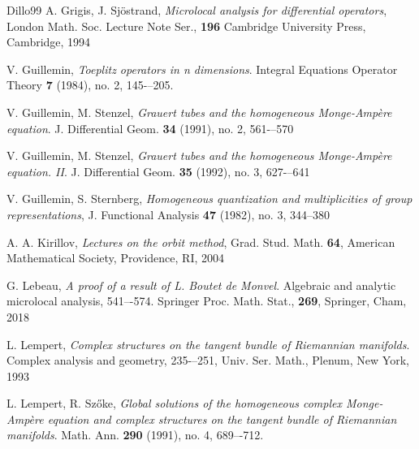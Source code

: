 \documentclass[12pt,a4paper]{article}
\theoremstyle{plain}
\theoremstyle{definition}
\begin{document}
\begin{thebibliography}{Dillo99}
A. Grigis, J. Sj\"{o}strand, {\em
Microlocal analysis for differential operators},
London Math. Soc. Lecture Note Ser., \textbf{196}
Cambridge University Press, Cambridge, 1994

V. Guillemin, {\em Toeplitz operators in n dimensions}. Integral Equations 
Operator Theory \textbf{7} (1984), no. 2, 145-–205.

V. Guillemin, M. Stenzel, {\em Grauert tubes and the homogeneous 
Monge-Amp\`{e}re equation}. J. Differential Geom. \textbf{34} (1991), no. 2, 561-–570

V. Guillemin, M. Stenzel, {\em Grauert tubes and the homogeneous Monge-Amp\`{e}re equation. II}. J. Differential Geom. \textbf{35} (1992), no. 3, 
627-–641


 V. Guillemin, S. Sternberg, 
{\em 
Homogeneous quantization and multiplicities of group representations},
J. Functional Analysis \textbf{47} (1982), no. 3, 344–380


A. A. Kirillov, 
{\em Lectures on the orbit method},
Grad. Stud. Math. \textbf{64},
American Mathematical Society, Providence, RI, 2004


G. Lebeau, {\em
A proof of a result of L. Boutet de Monvel}.
Algebraic and analytic microlocal analysis, 541–-574.
Springer Proc. Math. Stat., \textbf{269},
Springer, Cham, 2018


L. Lempert, {\em Complex structures on the tangent bundle of Riemannian manifolds}. 
Complex analysis and geometry, 235-–251, Univ. Ser. Math., Plenum, New York, 1993

L. Lempert, R. Sz\H{o}ke, {\em Global solutions of the homogeneous complex Monge-Amp\`{e}re equation and complex structures on the tangent bundle of Riemannian manifolds}. 
Math. Ann. \textbf{290} (1991), no. 4, 689–-712.



\end{thebibliography}
\end{document}

